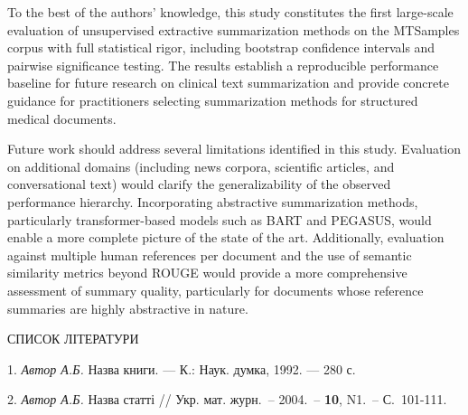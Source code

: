 \documentclass[10pt]{book}
\begin{document}
To the best of the authors' knowledge, this study constitutes the first large-scale evaluation of unsupervised extractive summarization methods on the MTSamples corpus with full statistical rigor, including bootstrap confidence intervals and pairwise significance testing. The results establish a reproducible performance baseline for future research on clinical text summarization and provide concrete guidance for practitioners selecting summarization methods for structured medical documents.

Future work should address several limitations identified in this study. Evaluation on additional domains (including news corpora, scientific articles, and conversational text) would clarify the generalizability of the observed performance hierarchy. Incorporating abstractive summarization methods, particularly transformer-based models such as BART and PEGASUS, would enable a more complete picture of the state of the art. Additionally, evaluation against multiple human references per document and the use of semantic similarity metrics beyond ROUGE would provide a more comprehensive assessment of summary quality, particularly for documents whose reference summaries are highly abstractive in nature.
\bigskip

{\normalsize\centerline{СПИСОК ЛІТЕРАТУРИ}
\medskip

1. {\it Автор А.Б.\/} Назва книги. --- К.: Наук. думка, 1992. --- 280 с.

2. {\it Автор А.Б.\/} Назва статті // Укр. мат. журн.~-- 2004.~-- {\bf 10}, N1.~-- С.~101-111.
}
\end{document}
